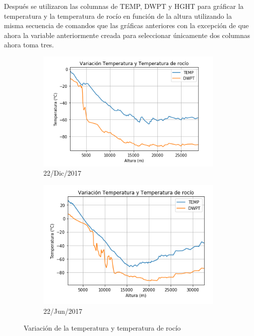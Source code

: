 \documentclass{article}
\begin{document}
Después se utilizaron las columnas de TEMP, DWPT y HGHT para gráficar la temperatura y la temperatura de rocío en función de la altura utilizando la misma secuencia de comandos que las gráficas anteriores con la excepción de que ahora la variable anteriormente creada para seleccionar únicamente dos columnas ahora toma tres.
\begin{figure}[ht!]
	\begin{subfigure}[b]{0.5\linewidth}
    \raggedleft
	\includegraphics[width=\linewidth]{5thInstDec.png}
    \caption{22/Dic/2017}
	\end{subfigure}
	\begin{subfigure}[b]{0.5\linewidth}
    \raggedright
	\includegraphics[width=\linewidth]{5thInstJun.png}
    \caption{22/Jun/2017}
	\end{subfigure}
    \caption{Variación de la temperatura y temperatura de rocío}
\end{figure}
\end{document}
